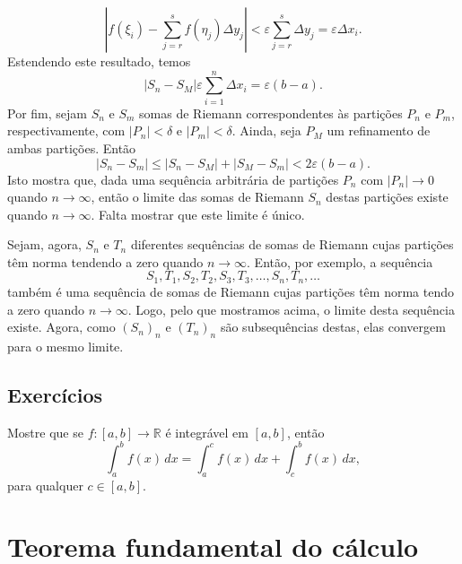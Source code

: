 \begin{dem}
\begin{equation}
  \left|f(\xi_i) - \sum_{j=r}^s f(\eta_j)\Delta y_j\right| < \varepsilon \sum_{j=r}^s \Delta y_j = \varepsilon\Delta x_i.
\end{equation}
Estendendo este resultado, temos
\begin{equation}
  |S_n - S_M| \varepsilon\sum_{i=1}^n \Delta x_i = \varepsilon (b-a).
\end{equation}
Por fim, sejam $S_n$ e $S_m$ somas de Riemann correspondentes às partições $P_n$ e $P_m$, respectivamente, com $|P_n|<\delta$ e $|P_m|<\delta$. Ainda, seja $P_M$ um refinamento de ambas partições. Então
\begin{equation}
  |S_n - S_m| \leq |S_n - S_M| + |S_M - S_m| < 2\varepsilon (b-a).
\end{equation}
Isto mostra que, dada uma sequência arbitrária de partições $P_n$ com $|P_n|\to 0$ quando $n\to \infty$, então o limite das somas de Riemann $S_n$ destas partições existe quando $n\to\infty$. Falta mostrar que este limite é único.

Sejam, agora, $S_n$ e $T_n$ diferentes sequências de somas de Riemann cujas partições têm norma tendendo a zero quando $n\to\infty$. Então, por exemplo, a sequência
\begin{equation}
  S_1, T_1, S_2, T_2, S_3, T_3, \dotsc, S_n, T_n, \ldots
\end{equation}
também é uma sequência de somas de Riemann cujas partições têm norma tendo a zero quando $n\to\infty$. Logo, pelo que mostramos acima, o limite desta sequência existe. Agora, como $(S_n)_n$ e $(T_n)_n$ são subsequências destas, elas convergem para o mesmo limite.
\end{dem}

\subsection*{Exercícios}

\begin{exer}
  Mostre que se $f:[a, b]\to\mathbb{R}$ é integrável em $[a, b]$, então
  \begin{equation}
    \int_a^b f(x)\,dx = \int_a^c f(x)\,dx + \int_c^b f(x)\,dx,
  \end{equation}
para qualquer $c\in [a, b]$.
\end{exer}

\section{Teorema fundamental do cálculo}\label{cap_integracao_sec_tfc}

